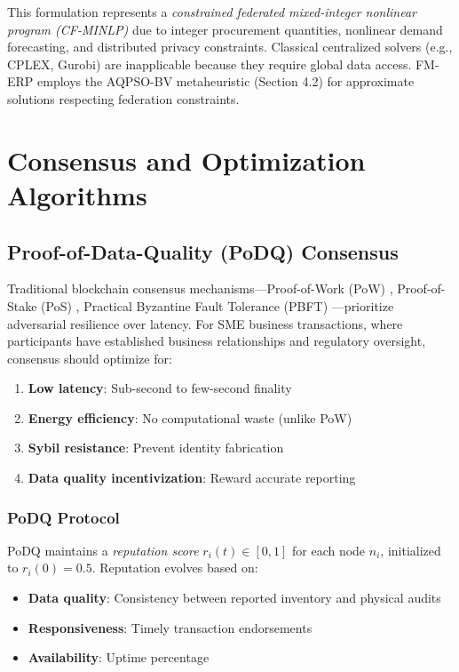 \documentclass[times,10pt,twocolumn]{jucs2e}
\begin{document}
This formulation represents a \textit{constrained federated mixed-integer nonlinear program (CF-MINLP)} due to integer procurement quantities, nonlinear demand forecasting, and distributed privacy constraints. Classical centralized solvers (e.g., CPLEX, Gurobi) are inapplicable because they require global data access. FM-ERP employs the AQPSO-BV metaheuristic (Section 4.2) for approximate solutions respecting federation constraints.


\section{Consensus and Optimization Algorithms}

\subsection{Proof-of-Data-Quality (PoDQ) Consensus}

Traditional blockchain consensus mechanisms---Proof-of-Work (PoW) \cite{Nakamoto2008}, Proof-of-Stake (PoS) \cite{King2012}, Practical Byzantine Fault Tolerance (PBFT) \cite{Castro1999}---prioritize adversarial resilience over latency. For SME business transactions, where participants have established business relationships and regulatory oversight, consensus should optimize for:
\begin{enumerate}
\item \textbf{Low latency}: Sub-second to few-second finality
\item \textbf{Energy efficiency}: No computational waste (unlike PoW)
\item \textbf{Sybil resistance}: Prevent identity fabrication
\item \textbf{Data quality incentivization}: Reward accurate reporting
\end{enumerate}

\subsubsection{PoDQ Protocol}

PoDQ maintains a \textit{reputation score} $r_i(t) \in [0, 1]$ for each node $n_i$, initialized to $r_i(0) = 0.5$. Reputation evolves based on:
\begin{itemize}
\item \textbf{Data quality}: Consistency between reported inventory and physical audits
\item \textbf{Responsiveness}: Timely transaction endorsements
\item \textbf{Availability}: Uptime percentage
\end{itemize}
\end{document}
